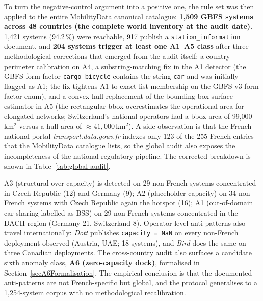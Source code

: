 \documentclass[11pt,a4paper]{article}
\begin{document}
\label{secGlobalAudit}%
To turn the negative-control argument into a positive one, the rule
set was then applied to the entire MobilityData canonical catalogue:
\textbf{1{,}509 GBFS systems across 48 countries (the complete world
inventory at the audit date)}. 1{,}421 systems (94.2\,\%) were
reachable, 917 publish a \texttt{station\_information} document, and
\textbf{204 systems trigger at least one A1--A5 class} after three
methodological corrections that emerged from the audit itself: a
country-perimeter calibration on A4, a substring-matching fix in the
A1 detector (the GBFS form factor \texttt{cargo\_bicycle} contains
the string \texttt{car} and was initially flagged as A1; the fix
tightens A1 to exact list membership on the GBFS v3 form factor
enum), and a convex-hull replacement of the bounding-box surface
estimator in A5 (the rectangular bbox overestimates the operational
area for elongated networks; Switzerland's national operators had a
bbox area of 99{,}000\,km$^2$ versus a hull area of
$\approx 41{,}000$\,km$^2$). A side observation is that the French
national portal \emph{transport.data.gouv.fr} indexes only 123 of
the 255 French entries that the MobilityData catalogue lists, so
the global audit also exposes the incompleteness of the national
regulatory pipeline. The corrected breakdown is shown in
Table~\ref{tab:global-audit}.

A3 (structural over-capacity) is detected on 29 non-French systems
concentrated in Czech Republic (12) and Germany (9); A2 (placeholder
capacity) on 34 non-French systems with Czech Republic again the
hotspot (16); A1 (out-of-domain car-sharing labelled as BSS) on 29
non-French systems concentrated in the DACH region (Germany 21,
Switzerland 8). Operator-level anti-patterns also travel
internationally: \emph{Dott} publishes \texttt{capacity = NaN} on
every non-French deployment observed (Austria, UAE; 18 systems),
and \emph{Bird} does the same on three Canadian deployments. The
cross-country audit also surfaces a candidate sixth anomaly class,
\textbf{A6 (zero-capacity dock)}, formalised in
Section~\ref{secA6Formalisation}. The empirical conclusion is that
the documented anti-patterns are not French-specific but global,
and the protocol generalises to a 1{,}254-system corpus with no
methodological recalibration.
\end{document}
